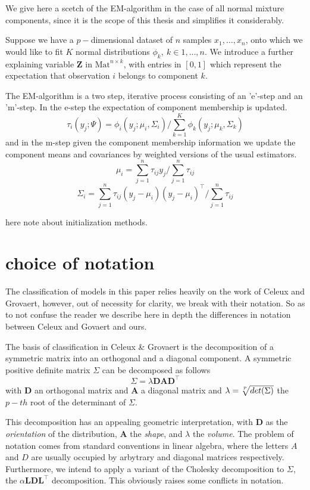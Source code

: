We give here a scetch of the EM-algorithm in the case of all normal mixture 
components, since it is the scope of this thesis and simplifies it 
considerably.

Suppose we have a $p-$dimensional dataset of $n$ samples $x_1, \dots ,x_n$,
onto which we would like to fit $K$ normal distributions 
$\phi_k,\ k \in {1,\dots , n}$. 
We introduce a further explaining variable $\pmb{Z}$ in 
$\textrm{Mat}^{n\times k}$, with entries in $[0,1]$ which represent the 
expectation that observation $i$ belongs to component $k$.

The EM-algorithm is a two step, iterative process consisting of an 'e'-step
and an 'm'-step.
In the e-step the expectation of component membership is updated.
\[ \tau_i(y_j;\Psi) = \phi_i(y_j;\mu_i, \Sigma_i)/ \sum_{k=1}^K \phi_k(y_j;
    \mu_k, \Sigma_k)\]
and in the m-step given the component membership information we update the 
component means and covariances by weighted versions of the usual estimators.
\[\mu_i = \sum_{j=1}^n \tau_{ij}y_j / \sum_{j=1}^n \tau_{ij}\]
\[\Sigma_i = \sum_{j=1}^n \tau_{ij} (y_j- \mu_i)(y_j-\mu_i)^\top / 
    \sum_{j=1}^n \tau_{ij}\]

here note about initialization methods.



\section{choice of notation}

The classification of models in this paper relies heavily on the work of Celeux
and Grovaert, however, out of necessity for clarity, we break with their 
notation. 
So as to not confuse the reader we describe here in depth the differences in 
notation between Celeux and Govaert and ours.

The basis of classification in Celeux \& Grovaert is the decomposition of a
symmetric matrix into an orthogonal and a diagonal component.
A symmetric positive definite matrix $ \Sigma $ can be decomposed as follows
    \[ \Sigma = \lambda \pmb{D} \pmb{A} \pmb{D}^{\top} \]
with $ \pmb{D} $ an orthogonal matrix and $ \pmb{A} $ a diagonal matrix and
$ \lambda = \sqrt[\uproot{3}p]{det(\Sigma)} $ the $ p-th $ root of the 
determinant of $ \Sigma $.

This decomposition has an appealing geometric interpretation, with $ \pmb{D} $ 
as the \textit{orientation} of the distribution, $ \pmb{A} $ the \textit{shape},
and $ \lambda $ the \textit{volume}. The problem of notation comes from standard 
conventions in linear algebra, where the letters $A$ and $D$ are usually 
occupied by arbytrary and diagonal matrices respectively. Furthermore, we intend
to apply a variant of the Cholesky decomposition to $ \Sigma $, the 
$ \alpha\pmb{L}\pmb{D}\pmb{L}^{\top} $ decomposition. This obviously raises some
conflicts in notation.

